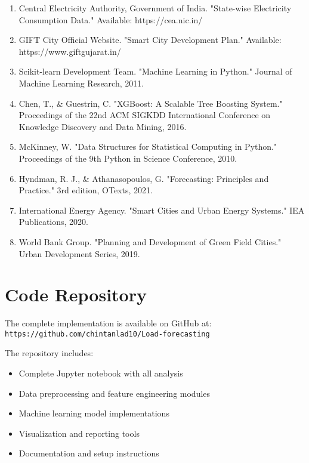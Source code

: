\documentclass[12pt,a4paper]{article}
\begin{document}
\begin{enumerate}
    \item Central Electricity Authority, Government of India. "State-wise Electricity Consumption Data." Available: https://cea.nic.in/
    
    \item GIFT City Official Website. "Smart City Development Plan." Available: https://www.giftgujarat.in/
    
    \item Scikit-learn Development Team. "Machine Learning in Python." Journal of Machine Learning Research, 2011.
    
    \item Chen, T., \& Guestrin, C. "XGBoost: A Scalable Tree Boosting System." Proceedings of the 22nd ACM SIGKDD International Conference on Knowledge Discovery and Data Mining, 2016.
    
    \item McKinney, W. "Data Structures for Statistical Computing in Python." Proceedings of the 9th Python in Science Conference, 2010.
    
    \item Hyndman, R. J., \& Athanasopoulos, G. "Forecasting: Principles and Practice." 3rd edition, OTexts, 2021.
    
    \item International Energy Agency. "Smart Cities and Urban Energy Systems." IEA Publications, 2020.
    
    \item World Bank Group. "Planning and Development of Green Field Cities." Urban Development Series, 2019.
\end{enumerate}

\appendix

\section{Code Repository}
The complete implementation is available on GitHub at: \\
\texttt{https://github.com/chintanlad10/Load-forecasting}

The repository includes:
\begin{itemize}
    \item Complete Jupyter notebook with all analysis
    \item Data preprocessing and feature engineering modules
    \item Machine learning model implementations
    \item Visualization and reporting tools
    \item Documentation and setup instructions
\end{itemize}
\end{document}

